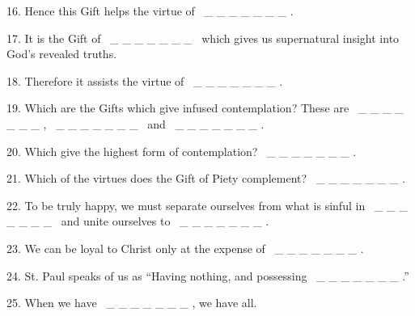 \documentclass[a4paper]{article}
\begin{document}
16. Hence this Gift helps the virtue of \ \_ \_ \_ \_ \_ \_ \_ .

17. It is the Gift of \ \_ \_ \_ \_ \_ \_ \_ \ which gives us supernatural insight into God's revealed truths.

18. Therefore it assists the virtue of \ \_ \_ \_ \_ \_ \_ \_ .

19. Which are the Gifts which give infused contemplation? These are \ \_ \_ \_ \_ \_ \_ \_ , \ \_ \_ \_ \_ \_ \_ \_ \ and \ \_ \_ \_ \_ \_ \_ \_ .

20. Which give the highest form of contemplation? \ \_ \_ \_ \_ \_ \_ \_ .

21. Which of the virtues does the Gift of Piety complement? \ \_ \_ \_ \_ \_ \_ \_ .

22. To be truly happy, we must separate ourselves from what is sinful in \ \_ \_ \_ \_ \_ \_ \_ \ and unite ourselves to \ \_ \_ \_ \_ \_ \_ \_ .

23. We can be loyal to Christ only at the expense of \ \_ \_ \_ \_ \_ \_ \_ .

24. St. Paul speaks of us as ``Having nothing, and possessing \ \_ \_ \_ \_ \_ \_ \_ .''

25. When we have \ \_ \_ \_ \_ \_ \_ \_ , we have all.


\bigskip


\bigskip
\end{document}
